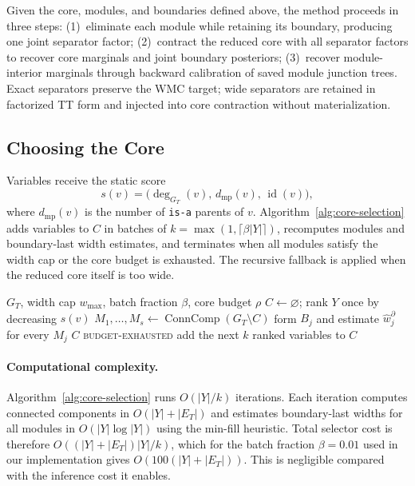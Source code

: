 \documentclass[12pt]{article}
\begin{document}
Given the core, modules, and boundaries defined above, the method
proceeds in three steps: (1)~eliminate each module while retaining its
boundary, producing one joint separator factor; (2)~contract the
reduced core with all separator factors to recover core marginals and
joint boundary posteriors; (3)~recover module-interior marginals through
backward calibration of saved module junction trees. Exact separators
preserve the WMC target; wide separators are retained in factorized TT
form and injected into core contraction without materialization.

\subsection{Choosing the Core}

Variables receive the static score
\[
  s(v) = \bigl(\deg_{G_T}(v),\,d_{\mathrm{mp}}(v),\,\operatorname{id}(v)\bigr),
\]
where $d_{\mathrm{mp}}(v)$ is the number of \texttt{is-a} parents of $v$.
Algorithm~\ref{alg:core-selection} adds variables to $C$ in batches of
$k=\max(1,\lceil\beta|Y|\rceil)$, recomputes modules and boundary-last
width estimates, and terminates when all modules satisfy the width cap
or the core budget is exhausted. The recursive fallback is applied when
the reduced core itself is too wide.

\begin{algorithm}[t]
\caption{Boundary-aware core selection}
\label{alg:core-selection}
\small
\begin{algorithmic}[1]
\Require $G_T$, width cap $w_{\max}$, batch fraction $\beta$, core budget $\rho$
\State $C\gets\varnothing$; rank $Y$ once by decreasing $s(v)$
\Loop
  \State $M_1,\ldots,M_s\gets\operatorname{ConnComp}(G_T\setminus C)$
  \State form $B_j$ and estimate $\widehat{w}_j^\partial$ for every $M_j$
    \State \Return $C$
  \EndIf
    \State \Return \textsc{budget-exhausted}
  \EndIf
  \State add the next $k$ ranked variables to $C$
\EndLoop
\end{algorithmic}
\end{algorithm}

\paragraph{Computational complexity.}
Algorithm~\ref{alg:core-selection} runs $O(|Y|/k)$ iterations. Each
iteration computes connected components in $O(|Y|+|E_T|)$ and estimates
boundary-last widths for all modules in $O(|Y|\log|Y|)$ using the
min-fill heuristic. Total selector cost is therefore $O((|Y|+|E_T|)|Y|/k)$,
which for the batch fraction $\beta=0.01$ used in our implementation
gives $O(100(|Y|+|E_T|))$. This is negligible compared with the
inference cost it enables.
\end{document}
